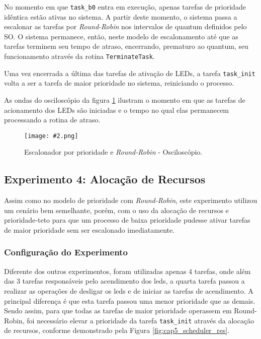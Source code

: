 \documentclass[conference,compsoc]{IEEEtran}
\newcommand{\reffig}[1]{Figura \ref{fig:#1}}
\newcommand{\figura}[5][Extraido de:]{
	\begin{figure}[h!tb]
		\centering
		\caption{#3.}
		\texttt{[image: \#2.png]}
		\ifthenelse{\isempty{#5}}{}{%
			\\ #1 \cite{#5}.
		}	
		\label{fig:#2}
	\end{figure}
}
\begin{document}
No momento em que \texttt{task\_b0} entra em execução, apenas tarefas de prioridade idêntica estão ativas no sistema. A partir deste momento, o sistema passa a escalonar as tarefas por \emph{Round-Robin} nos intervalos de quantum definidos pelo SO. O sistema permanece, então, neste modelo de escalonamento até que as tarefas terminem seu tempo de atraso, encerrando, prematuro ao quantum, seu funcionamento através da rotina \texttt{TerminateTask}.

Uma vez encerrada a última das tarefas de ativação de LEDs, a tarefa \texttt{task\_init} volta a ser a tarefa de maior prioridade no sistema, reiniciando o processo.

As ondas do osciloscópio da figura \ref{fig:cap5_scheduler_prr_osc} ilustram o momento em que as tarefas de acionamento dos LEDs são iniciadas e o tempo no qual elas permanecem processando a rotina de atraso.

\figura{cap5_scheduler_prr_osc}{Escalonador por prioridade e \emph{Round-Robin} - Osciloscópio}{6cm}{}



\subsection{Experimento 4: Alocação de Recursos}

Assim como no modelo de prioridade com \emph{Round-Robin}, este experimento utilizou um cenário bem semelhante, porém, com o uso da alocação de recursos e prioridade-teto para que um processo de baixa prioridade pudesse ativar tarefas de maior prioridade sem ser escalonado imediatamente.

\subsubsection{Configuração do Experimento}

Diferente dos outros experimentos, foram utilizadas apenas 4 tarefas, onde além das 3 tarefas responsáveis pelo acendimento dos leds, a quarta tarefa passou a realizar as operações de desligar os leds e de iniciar as tarefas de acendimento. A principal diferença é que esta tarefa passou uma menor prioridade que as demais. Sendo assim, para que todas as tarefas de maior prioridade operassem em Round-Robin, foi necessário elevar a prioridade da tarefa \texttt{task\_init} através da alocação de recursos, conforme demonstrado pela \reffig{cap5_scheduler_res}.
\end{document}
